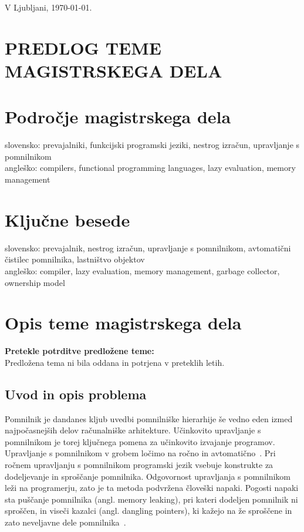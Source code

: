 \documentclass[a4paper, 12pt]{article}
\begin{document}
\bigskip

\hfill V Ljubljani, \today.

\clearpage
\section*{PREDLOG TEME MAGISTRSKEGA DELA}

\section{Področje magistrskega dela}

slovensko: prevajalniki, funkcijski programski jeziki, nestrog izračun, upravljanje s pomnilnikom \\
angleško: compilers, functional programming languages, lazy evaluation, memory management


\section{Ključne besede}

slovensko: prevajalnik, nestrog izračun, upravljanje s pomnilnikom, avtomatični čistilec pomnilnika, lastništvo objektov \\
angleško: compiler, lazy evaluation, memory management, garbage collector, ownership model


\section{Opis teme magistrskega dela}

\textbf{Pretekle potrditve predložene teme:}\\
Predložena tema ni bila oddana in potrjena v preteklih letih.

\subsection{Uvod in opis problema}

Pomnilnik je dandanes kljub uvedbi pomnilniške hierarhije še vedno eden izmed najpočasnejših delov računalniške arhitekture. Učinkovito upravljanje s pomnilnikom je torej ključnega pomena za učinkovito izvajanje programov. Upravljanje s pomnilnikom v grobem ločimo na ročno in avtomatično~\cite{jones2023garbage}. Pri ročnem upravljanju s pomnilnikom programski jezik vsebuje konstrukte za dodeljevanje in sproščanje pomnilnika. Odgovornost upravljanja s pomnilnikom leži na programerju, zato je ta metoda podvržena človeški napaki. Pogosti napaki sta puščanje pomnilnika (angl. memory leaking), pri kateri dodeljen pomnilnik ni sproščen, in viseči kazalci (angl. dangling pointers), ki kažejo na že sproščene in zato neveljavne dele pomnilnika~\cite{jones2023garbage}.
\end{document}
